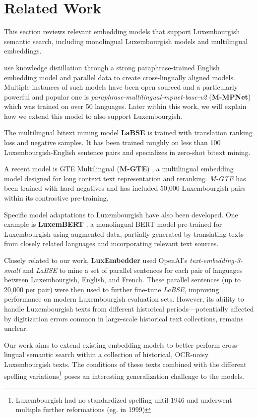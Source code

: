 \section{Related Work}
This section reviews relevant embedding models that support Luxembourgish semantic search, including monolingual Luxembourgish models and multilingual embeddings.


\citet{reimers-gurevych-2020-making} use knowledge distillation through a strong paraphrase-trained English embedding model and parallel data to create cross-lingually aligned models. Multiple instances of such models have been open sourced and a particularly powerful and popular one is \textit{paraphrase-multilingual-mpnet-base-v2} (\textbf{M-MPNet}) which was trained on over 50 languages. Later within this work, we will explain how we extend this model to also support Luxembourgish.

The multilingual bitext mining model \textbf{LaBSE} \citep{feng-etal-2022-language} is trained with translation ranking loss and negative samples.  It has been trained roughly on less than 100 Luxembourgish-English sentence pairs and specializes in zero-shot bitext mining. 

A recent model is GTE Multilingual (\textbf{M-GTE}) \citep{zhang-etal-2024-mgte}, a multilingual embedding model designed for long context text representation and reranking.  \textit{M-GTE} has been trained with hard negatives and has included 50,000 Luxembourgish pairs within its contrastive pre-training.

Specific model adaptations to Luxembourgish have also been developed. One example is \textbf{LuxemBERT} \citep{lothritz-etal-2022-luxembert}, a monolingual BERT model pre-trained for Luxembourgish using augmented data, partially generated by translating texts from closely related languages and incorporating relevant text sources. 

Closely related to our work, \textbf{LuxEmbedder} \citep{philippy-etal-2025-luxembedder} used OpenAI's \textit{text-embedding-3-small} and \textit{LaBSE} to mine a set of parallel sentences for each pair of languages between Luxembourgish, English, and French. These parallel sentences (up to 20,000 per pair) were then used to further fine-tune \textit{LaBSE}, improving performance on modern Luxembourgish evaluation sets. However, its ability to handle Luxembourgish texts from different historical periods---potentially affected by digitization errors common in large-scale historical text collections, remains unclear.

Our work aims to extend existing embedding models to better perform cross-lingual semantic search within a collection of historical, OCR-noisy Luxembourgish texts. The conditions of these texts combined with the different spelling variations\footnote{Luxembourgish had no standardized spelling until 1946 and underwent multiple further reformations (eg. in 1999)} poses an interesting generalization challenge to the models.